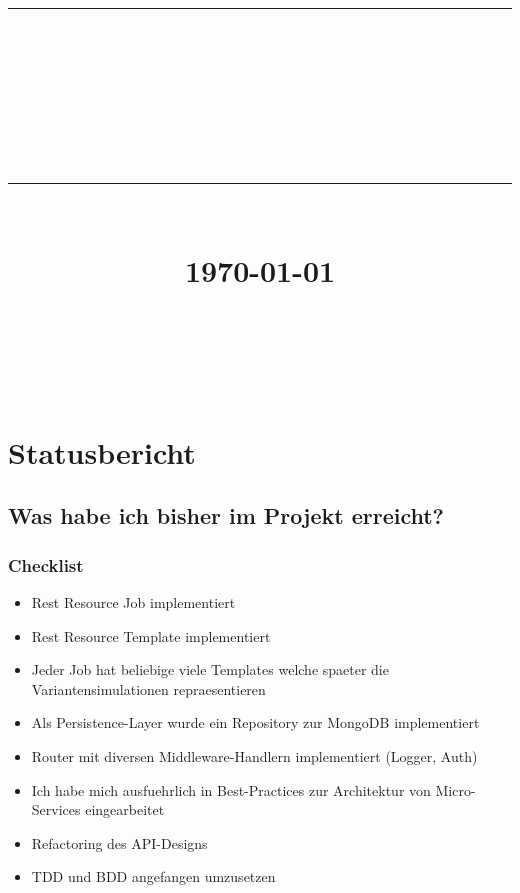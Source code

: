 \documentclass[12pt]{article}
\newcommand{\HRule}[1]{\rule{\linewidth}{#1}}
\begin{document}
\title{ \normalsize
		\HRule{0.5pt} \\
		\LARGE \textbf{\uppercase{\newCommandDiscipline}} \\
		\smallbreak
		\small\textbf{{\newCommandTerm}}\\
		\HRule{2pt} \\ [0.5cm]
		\normalsize \today \vspace*{10\baselineskip}}

\date{}

\author{
		\newCommandName \\
		\newCommandMatriculationNumber \\
		\newCommandUniversity \\
		\newCommandFaculty
}


\maketitle

\newpage



\sectionfont{\scshape}


\section{Statusbericht}
\subsection{Was habe ich bisher im Projekt erreicht?}
\subsubsection{Checklist}
\begin{itemize}
	\item Rest Resource Job implementiert
	\item Rest Resource Template implementiert
	\item Jeder Job hat beliebige viele Templates welche spaeter die Variantensimulationen repraesentieren
	\item Als Persistence-Layer wurde ein Repository zur MongoDB implementiert
	\item Router mit diversen Middleware-Handlern implementiert (Logger, Auth)
	\item Ich habe mich ausfuehrlich in Best-Practices zur Architektur von Micro-Services eingearbeitet
	\item Refactoring des API-Designs
	\item TDD und BDD angefangen umzusetzen
\end{itemize}
\smallbreak
\end{document}
